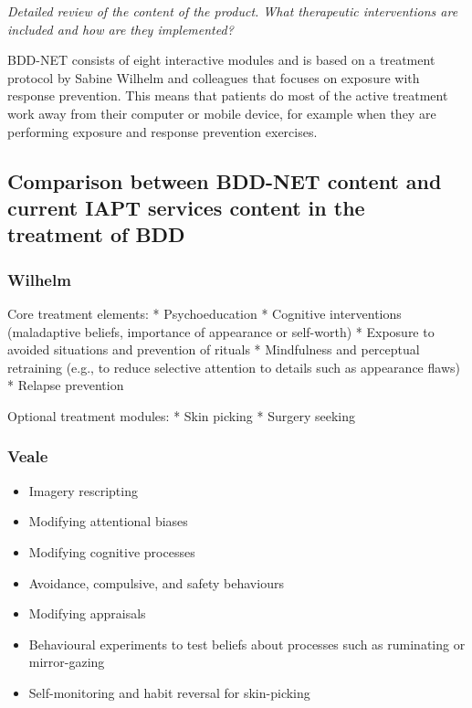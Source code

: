 \documentclass[]{book}
\providecommand{\tightlist}{%
  \setlength{\itemsep}{0pt}\setlength{\parskip}{0pt}}
\theoremstyle{definition}
\theoremstyle{definition}
\theoremstyle{definition}
\theoremstyle{remark}
\begin{document}
\emph{Detailed review of the content of the product. What therapeutic
interventions are included and how are they implemented?}

BDD-NET consists of eight interactive modules and is based on a
treatment protocol by Sabine Wilhelm and colleagues \citep{wilhelm2013}
that focuses on exposure with response prevention. This means that
patients do most of the active treatment work away from their computer
or mobile device, for example when they are performing exposure and
response prevention exercises.

\hypertarget{comparison-between-bdd-net-content-and-current-iapt-services-content-in-the-treatment-of-bdd}{%
\subsection{Comparison between BDD-NET content and current IAPT services
content in the treatment of
BDD}\label{comparison-between-bdd-net-content-and-current-iapt-services-content-in-the-treatment-of-bdd}}

\hypertarget{wilhelm-wilhelm2013}{%
\subsubsection{\texorpdfstring{Wilhelm
\citep{wilhelm2013}}{Wilhelm {[}@wilhelm2013{]}}}\label{wilhelm-wilhelm2013}}

Core treatment elements: * Psychoeducation * Cognitive interventions
(maladaptive beliefs, importance of appearance or self-worth) * Exposure
to avoided situations and prevention of rituals * Mindfulness and
perceptual retraining (e.g., to reduce selective attention to details
such as appearance flaws) * Relapse prevention

Optional treatment modules: * Skin picking * Surgery seeking

\hypertarget{veale-veale2010}{%
\subsubsection{\texorpdfstring{Veale
\citep{veale2010}}{Veale {[}@veale2010{]}}}\label{veale-veale2010}}

\begin{itemize}
\tightlist
\item
  Imagery rescripting
\item
  Modifying attentional biases
\item
  Modifying cognitive processes
\item
  Avoidance, compulsive, and safety behaviours
\item
  Modifying appraisals
\item
  Behavioural experiments to test beliefs about processes such as
  ruminating or mirror-gazing
\item
  Self-monitoring and habit reversal for skin-picking
\end{itemize}
\end{document}
